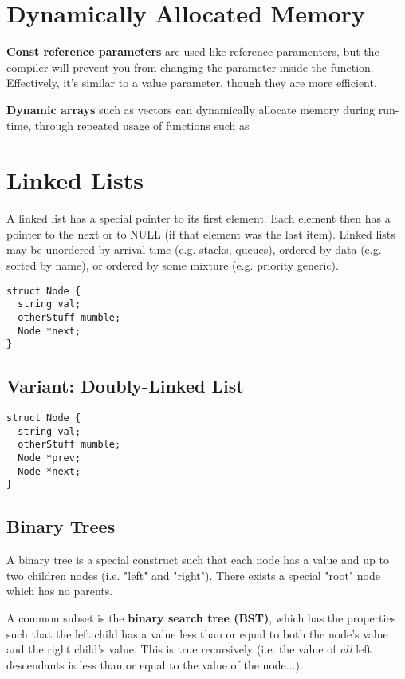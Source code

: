 \documentclass[12pt]{article}
\begin{document}
\section*{Dynamically Allocated Memory}
{\bf Const reference parameters} are used like reference paramenters, but the compiler will prevent you from changing the parameter inside the function. Effectively, it's similar to a value parameter, though they are more efficient.

{\bf Dynamic arrays} such as vectors can dynamically allocate memory during run-time, through repeated usage of functions such as 

\section*{Linked Lists}
A linked list has a special pointer to its first element. Each element then has a pointer to the next or to NULL (if that element was the last item). Linked lists may be unordered by arrival time (e.g. stacks, queues), ordered by data (e.g. sorted by name), or ordered by some mixture (e.g. priority generic).

\begin{verbatim}
struct Node {
  string val;
  otherStuff mumble;
  Node *next;
}
\end{verbatim}

\subsection*{Variant: Doubly-Linked List}
\begin{verbatim}
struct Node {
  string val;
  otherStuff mumble;
  Node *prev;
  Node *next;
}
\end{verbatim}

\subsection*{Binary Trees}
A binary tree is a special construct such that each node has a value and up to two children nodes (i.e. "left" and "right"). There exists a special "root" node which has no parents. 

A common subset is the {\bf binary search tree (BST)}, which has the properties such that the left child has a value less than or equal to both the node's value and the right child's value. This is true recursively (i.e. the value of {\it all} left descendants is less than or equal to the value of the node...).
\end{document}
